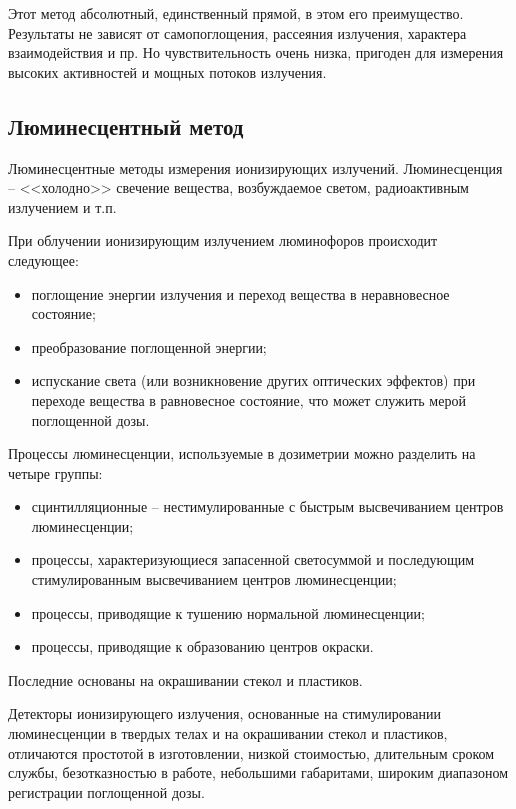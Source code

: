 \documentclass[14pt,pscyr,titlepage]{hedreport}
\begin{document}
		Этот метод абсолютный, единственный прямой, в этом его преимущество. 
		Результаты не зависят от самопоглощения, рассеяния излучения, характера 
		взаимодействия и пр. Но чувствительность очень низка, пригоден для 
		измерения высоких активностей и мощных потоков излучения.

	\subsection{Люминесцентный метод}
		Люминесцентные методы измерения ионизирующих излучений. 
		Люминесценция -- <<холодно>> свечение вещества, возбуждаемое светом, 
		радиоактивным излучением и т.п.

		При облучении ионизирующим излучением люминофоров происходит следующее:
		\begin{itemize}\itemsep-2pt
			\item поглощение энергии излучения и переход вещества в 
				неравновесное состояние;
			\item преобразование поглощенной энергии;
			\item испускание света (или возникновение других оптических 
				эффектов) при переходе вещества в равновесное состояние, 
				что может служить мерой поглощенной дозы.
		\end{itemize}

		Процессы люминесценции, используемые в дозиметрии можно разделить 
		на четыре группы:
		\begin{itemize}\itemsep-2pt
			\item сцинтилляционные -- нестимулированные с быстрым 
				высвечиванием центров люминесценции;
			\item процессы, характеризующиеся запасенной светосуммой и 
				последующим стимулированным высвечиванием центров 
				люминесценции;
			\item процессы, приводящие к тушению нормальной люминесценции;
			\item процессы, приводящие к образованию центров окраски.
		\end{itemize}

		Последние основаны на окрашивании стекол и пластиков.

		Детекторы ионизирующего излучения, основанные на стимулировании 
		люминесценции в твердых телах и на окрашивании стекол и пластиков, 
		отличаются простотой в изготовлении, низкой стоимостью, длительным 
		сроком службы, безотказностью в работе, небольшими габаритами, широким 
		диапазоном регистрации поглощенной дозы.
\end{document}
